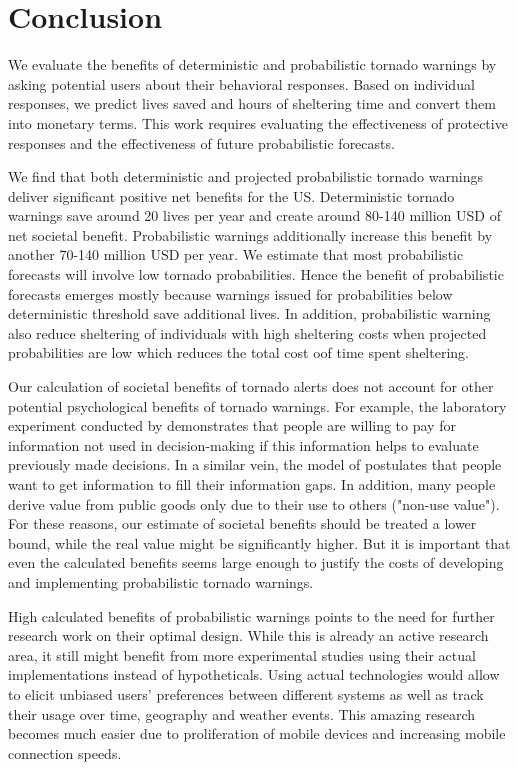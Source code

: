 \documentclass{ametsocV6.1}
\begin{document}
\vspace{30pt}
\section{Conclusion}

We evaluate the benefits of deterministic and probabilistic tornado warnings by asking potential users about their behavioral responses. Based on individual responses, we predict lives saved and hours of sheltering time and convert them into monetary terms. This work requires evaluating the effectiveness of protective responses and the effectiveness of future probabilistic forecasts.

We find that both deterministic and projected probabilistic tornado warnings deliver significant positive net benefits for the US. Deterministic tornado warnings save around 20 lives per year and create around 80-140 million USD of net societal benefit. Probabilistic warnings additionally increase this benefit by another 70-140 million USD per year. We estimate that most probabilistic forecasts will involve low tornado probabilities. Hence the benefit of probabilistic forecasts emerges mostly because warnings issued for probabilities below deterministic threshold save additional lives. In addition, probabilistic warning also reduce sheltering of individuals with high sheltering costs when projected probabilities are low which reduces the total cost oof time spent sheltering.

Our calculation of societal benefits of tornado alerts does not account for other potential psychological benefits of tornado warnings. For example, the laboratory experiment conducted by \citet{eliaz_paying_2010} demonstrates that people are willing to pay for information not used in decision-making if this information helps to evaluate previously made decisions. In a similar vein, the model of \citet{golman_demand_2021} postulates that people want to get information to fill their information gaps. In addition, many people derive value from public goods only due to their use to others ("non-use value"). For these reasons, our estimate of societal benefits should be treated a lower bound, while the real value might be significantly higher. But it is important that even the calculated benefits seems large enough to justify the costs of developing and implementing probabilistic tornado warnings.

High calculated benefits of probabilistic warnings points to the need for further research work on their optimal design. While this is already an active research area, it still might benefit from more experimental studies using their actual implementations instead of hypotheticals. Using actual technologies would allow to elicit unbiased users' preferences between different systems as well as track their usage over time, geography and weather events. This amazing research becomes much easier due to proliferation of mobile devices and increasing mobile connection speeds.
\end{document}
